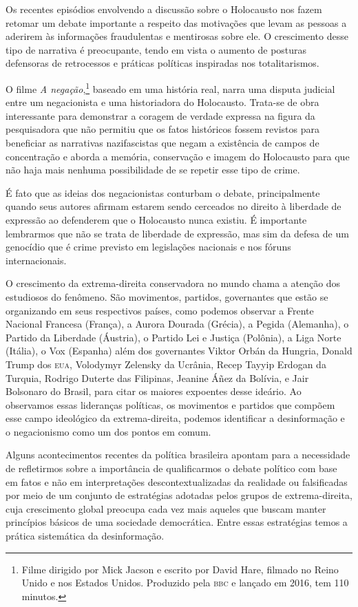 Os recentes episódios envolvendo a discussão sobre o Holocausto nos
fazem retomar um debate importante a respeito das motivações que levam
as pessoas a aderirem às informações fraudulentas e mentirosas sobre
ele. O crescimento desse tipo de narrativa é preocupante, tendo em vista
o aumento de posturas defensoras de retrocessos e práticas políticas
inspiradas nos totalitarismos.

O filme \textit{A negação},\footnote{Filme dirigido por Mick Jacson e
  escrito por David Hare, filmado no Reino Unido e nos Estados Unidos. Produzido pela \textsc{bbc} e lançado em 2016, tem 110 minutos.} baseado em uma história real, narra uma
disputa judicial entre um negacionista e uma historiadora do Holocausto.
Trata-se de obra interessante para demonstrar a coragem de verdade
expressa na figura da pesquisadora que não permitiu que os fatos
históricos fossem revistos para beneficiar as narrativas nazifascistas
que negam a existência de campos de concentração e aborda a memória,
conservação e imagem do Holocausto para que não haja mais nenhuma
possibilidade de se repetir esse tipo de crime.

É fato que as ideias dos negacionistas conturbam o debate,
principalmente quando seus autores afirmam estarem sendo cerceados no
direito à liberdade de expressão ao defenderem que o Holocausto nunca
existiu. É importante lembrarmos que não se trata de liberdade de
expressão, mas sim da defesa de um genocídio que é crime previsto em
legislações nacionais e nos fóruns internacionais.

O crescimento da extrema-direita conservadora no mundo chama a atenção
dos estudiosos do fenômeno. São movimentos, partidos, governantes que
estão se organizando em seus respectivos países, como podemos observar a
Frente Nacional Francesa (França), a Aurora Dourada (Grécia), a Pegida
(Alemanha), o Partido da Liberdade (Áustria), o Partido Lei e Justiça
(Polônia), a Liga Norte (Itália), o Vox (Espanha) além dos governantes
Viktor Orbán da Hungria, Donald Trump dos \textsc{eua},
Volodymyr Zelensky da Ucrânia, Recep Tayyip Erdogan da Turquia, Rodrigo Duterte
das Filipinas, Jeanine Áñez da Bolívia, e Jair
Bolsonaro do Brasil, para citar os maiores expoentes desse ideário. Ao
observamos essas lideranças políticas, os movimentos e partidos que
compõem esse campo ideológico da extrema-direita, podemos identificar a
desinformação e o negacionismo como um dos pontos em comum.

Alguns acontecimentos recentes da política brasileira apontam para a
necessidade de refletirmos sobre a importância de qualificarmos o debate
político com base em fatos e não em interpretações descontextualizadas
da realidade ou falsificadas por meio de um conjunto de estratégias
adotadas pelos grupos de extrema-direita, cuja crescimento global
preocupa cada vez mais aqueles que buscam manter princípios básicos de
uma sociedade democrática. Entre essas estratégias temos a prática
sistemática da desinformação.


